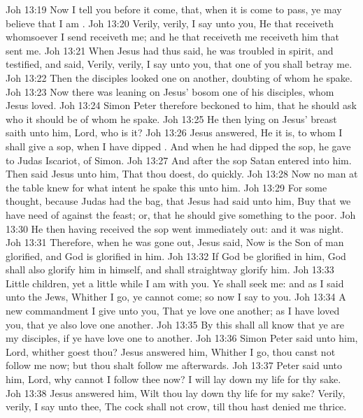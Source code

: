 \vs Joh 13:19 Now I tell you before it come, that, when it is come to pass, ye may believe that I am .
\vs Joh 13:20 Verily, verily, I say unto you, He that receiveth whomsoever I send receiveth me; and he that receiveth me receiveth him that sent me.
\vs Joh 13:21 When Jesus had thus said, he was troubled in spirit, and testified, and said, Verily, verily, I say unto you, that one of you shall betray me.
\vs Joh 13:22 Then the disciples looked one on another, doubting of whom he spake.
\vs Joh 13:23 Now there was leaning on Jesus' bosom one of his disciples, whom Jesus loved.
\vs Joh 13:24 Simon Peter therefore beckoned to him, that he should ask who it should be of whom he spake.
\vs Joh 13:25 He then lying on Jesus' breast saith unto him, Lord, who is it?
\vs Joh 13:26 Jesus answered, He it is, to whom I shall give a sop, when I have dipped . And when he had dipped the sop, he gave  to Judas Iscariot,  of Simon.
\vs Joh 13:27 And after the sop Satan entered into him. Then said Jesus unto him, That thou doest, do quickly.
\vs Joh 13:28 Now no man at the table knew for what intent he spake this unto him.
\vs Joh 13:29 For some  thought, because Judas had the bag, that Jesus had said unto him, Buy  that we have need of against the feast; or, that he should give something to the poor.
\vs Joh 13:30 He then having received the sop went immediately out: and it was night.
\vs Joh 13:31 Therefore, when he was gone out, Jesus said, Now is the Son of man glorified, and God is glorified in him.
\vs Joh 13:32 If God be glorified in him, God shall also glorify him in himself, and shall straightway glorify him.
\vs Joh 13:33 Little children, yet a little while I am with you. Ye shall seek me: and as I said unto the Jews, Whither I go, ye cannot come; so now I say to you.
\vs Joh 13:34 A new commandment I give unto you, That ye love one another; as I have loved you, that ye also love one another.
\vs Joh 13:35 By this shall all  know that ye are my disciples, if ye have love one to another.
\vs Joh 13:36 Simon Peter said unto him, Lord, whither goest thou? Jesus answered him, Whither I go, thou canst not follow me now; but thou shalt follow me afterwards.
\vs Joh 13:37 Peter said unto him, Lord, why cannot I follow thee now? I will lay down my life for thy sake.
\vs Joh 13:38 Jesus answered him, Wilt thou lay down thy life for my sake? Verily, verily, I say unto thee, The cock shall not crow, till thou hast denied me thrice.
